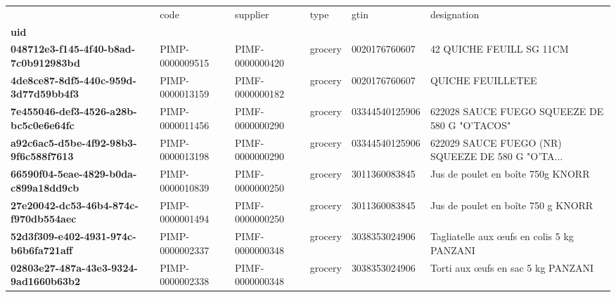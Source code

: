\begin{table}
\centering
\label{tab:dup_gtin}
\begin{tabularx}{\linewidth}{lXXXXX}
\toprule
{} &             code &         supplier &     type &            gtin &                                        designation \\
\textbf{uid                                 } &                  &                  &          &                 &                                                    \\
\midrule
\textbf{048712e3-f145-4f40-b8ad-7c0b912983bd} &  PIMP-0000009515 &  PIMF-0000000420 &  grocery &   0020176760607 &                           42 QUICHE FEUILL SG 11CM \\
\textbf{4de8ce87-8df5-440c-959d-3d77d59bb4f3} &  PIMP-0000013159 &  PIMF-0000000182 &  grocery &   0020176760607 &                                  QUICHE FEUILLETEE \\
\textbf{7e455046-def3-4526-a28b-bc5c0e6e64fc} &  PIMP-0000011456 &  PIMF-0000000290 &  grocery &  03344540125906 &      622028 SAUCE FUEGO SQUEEZE DE 580 G "O'TACOS" \\
\textbf{a92c6ac5-d5be-4f92-98b3-9f6c588f7613} &  PIMP-0000013198 &  PIMF-0000000290 &  grocery &  03344540125906 &  622029 SAUCE FUEGO (NR) SQUEEZE DE 580 G "O'TA... \\
\textbf{66590f04-5eae-4829-b0da-c899a18dd9cb} &  PIMP-0000010839 &  PIMF-0000000250 &  grocery &   3011360083845 &                  Jus de poulet en boîte 750g KNORR \\
\textbf{27e20042-dc53-46b4-874c-f970db554aec} &  PIMP-0000001494 &  PIMF-0000000250 &  grocery &   3011360083845 &                 Jus de poulet en boîte 750 g KNORR \\
\textbf{52d3f309-e402-4931-974c-b6b6fa721aff} &  PIMP-0000002337 &  PIMF-0000000348 &  grocery &   3038353024906 &         Tagliatelle aux œufs en colis 5 kg PANZANI \\
\textbf{02803e27-487a-43e3-9324-9ad1660b63b2} &  PIMP-0000002338 &  PIMF-0000000348 &  grocery &   3038353024906 &                 Torti aux œufs en sac 5 kg PANZANI \\
\bottomrule
\end{tabularx}
\end{table}

